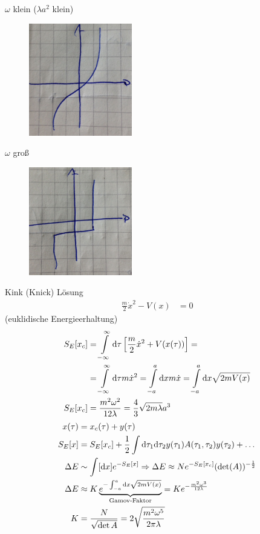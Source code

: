 $\omega$ klein ($\lambda a^2$ klein)
	\begin{figure} [h]
		\begin{center}
			\includegraphics[width= 0.4\textwidth]{Tunneln_durch_eine_Potentialbarriere7}
		\end{center}
	\end{figure}
\FloatBarrier		
$\omega$ groß
	\begin{figure} [h]
		\begin{center}
			\includegraphics[width= 0.4\textwidth]{Tunneln_durch_eine_Potentialbarriere8}
		\end{center}
	\end{figure} 
\FloatBarrier
Kink (Knick) Lösung
	\begin{align*}
		\frac{m}{2} \dot{x}^2 - V(x) &= 0 
	\end{align*}
(euklidische Energieerhaltung)
	\begin{align*}
		S_E[x_c] &= \int\limits_{-\infty}^{\infty} \mathrm{d} \tau
		\left[\frac{m}{2} \dot{x}^2 + V(x(\tau))\right] = \\
		&=\int \limits_{-\infty}^\infty \mathrm{d} \tau m\dot{x}^2
		= \int \limits_{-a}^a \mathrm{d} x m \dot{x}
		= \int \limits_{-a}^a \mathrm{d} x \sqrt{2m V(x)} \\
		S_E[x_c] &= \frac{m^2 \omega^2}{12 \lambda} = \frac{4}{3} \sqrt{2m\lambda} a^3
	\end{align*}
	\begin{align*}
		x(\tau) &= x_c (\tau) + y(\tau) \\
		S_E[x] &= S_E [x_c] + \frac{1}{2} \int \diff \tau_1 \diff \tau_2 
		y(\tau_1) A(\tau_1, \tau_2) y(\tau_2) + \ldots \\
		\Delta E &\sim \int [\diff x] e^{-S_E[x]} 
		\Rightarrow \Delta E \approx N e^{-S_E[x_c]} (\det(A))^{-\frac{1}{2}} \\
		\Delta E &\approx K \underbrace{e^{- \int_{-a}^{a} \diff x \sqrt{2m V(x)}}}_{\mathclap{\text{Gamov-Faktor}}}
		= K e^{-\frac{m^2\omega^3}{12 \lambda}} \\
		K &= \frac{N}{\sqrt{\det A}} = 2 \sqrt{\frac{m^2 \omega^5}{2 \pi \lambda}}
	\end{align*}